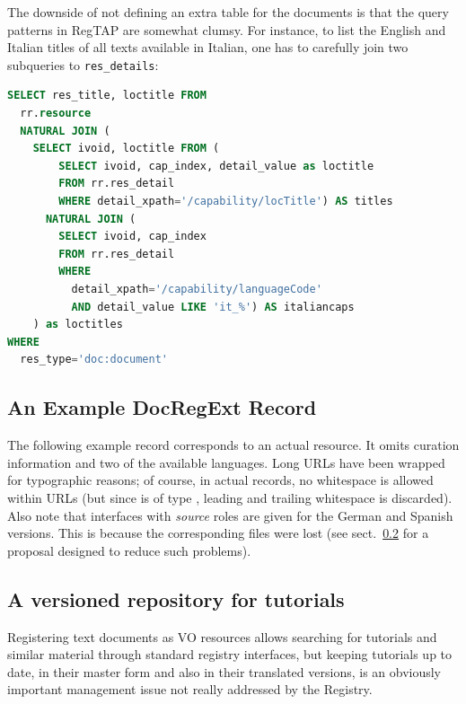 \documentclass{ivoa}
\begin{document}
The downside of not defining an extra table for the documents is that
the query patterns in RegTAP are somewhat clumsy.  For instance, to list
the English and Italian titles of all texts available in Italian, one
has to carefully join two subqueries to \verb|res_details|:

\begin{lstlisting}[language=SQL]
SELECT res_title, loctitle FROM
  rr.resource 
  NATURAL JOIN (
    SELECT ivoid, loctitle FROM (
        SELECT ivoid, cap_index, detail_value as loctitle
        FROM rr.res_detail
        WHERE detail_xpath='/capability/locTitle') AS titles
      NATURAL JOIN (
        SELECT ivoid, cap_index 
        FROM rr.res_detail
        WHERE 
          detail_xpath='/capability/languageCode'
          AND detail_value LIKE 'it_%') AS italiancaps
    ) as loctitles
WHERE
  res_type='doc:document'
\end{lstlisting}

\subsection{An Example DocRegExt Record}

The following example record corresponds to an actual resource.  It
omits curation information and two of the available languages.  Long
URLs have been wrapped for typographic reasons; of course, in actual
records, no whitespace is allowed within URLs (but since
 is of type , leading and trailing
whitespace is discarded).  Also note that interfaces with
\textit{source} roles
are given for the German and Spanish versions.  This is because the
corresponding files were lost (see sect.~\ref{sect:svn-repo} for a
proposal designed to reduce such problems).



\subsection{A versioned repository for tutorials}

\label{sect:svn-repo}

Registering text documents as VO resources allows searching for tutorials
and similar 
material through standard registry interfaces, but keeping 
tutorials up to date, in their master form and also in their translated 
versions, is an obviously important management issue not really
addressed by the Registry.
\end{document}
